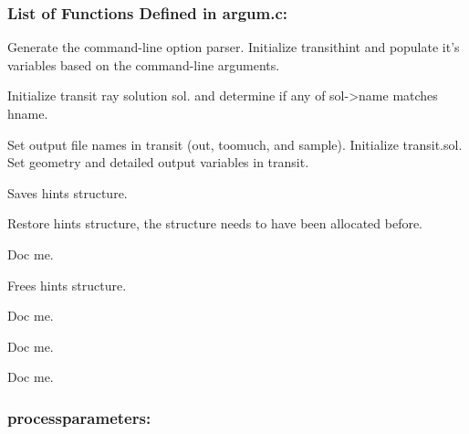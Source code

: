 \documentclass[letterpaper,12pt]{article}
\begin{document}
\subsubsection{List of Functions Defined in argum.c:}
Generate the command-line option parser.  Initialize transithint and
populate it's variables based on the command-line arguments. \newline

Initialize transit ray solution sol. and determine if any of
sol->name matches hname. \newline

Set output file names in transit (out, toomuch, and sample).
Initialize transit.sol. Set geometry and detailed output variables in
transit. \newline

Saves hints structure. \newline

Restore hints structure, the structure needs to have been allocated
before. \newline

Doc me. \newline

Frees hints structure. \newline

Doc me. \newline

Doc me. \newline

Doc me. \newline


\subsubsection{processparameters:}
\end{document}
